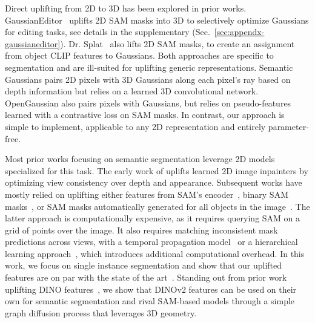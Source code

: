  Direct uplifting from 2D to 3D has been explored in prior works.
GaussianEditor~\citep{chen2024gaussianeditor} uplifts 2D SAM masks into 3D to selectively optimize Gaussians for editing tasks, see details in the supplementary (Sec.~\ref{sec:appendx-gaussianeditor}). Dr. Splat~\citep{jun2025drsplat} also lifts 2D SAM masks, to create an assignment from object CLIP features to Gaussians. Both approaches are specific to segmentation and are ill-suited for uplifting generic representations. Semantic Gaussians \citep{guo2024semantic} pairs 2D pixels with 3D Gaussians along each pixel’s ray based on depth information but relies on a learned 3D convolutional network. OpenGaussian \citep{wu2024opengaussian} also pairs pixels with  Gaussians, but relies on pseudo-features learned with a contrastive loss on SAM masks. In contrast, our approach is simple to implement, applicable to any 2D representation and entirely parameter-free.

Most prior works focusing on semantic segmentation leverage 2D models specialized for this task. The early work of \cite{yen2022nerfsupervision} uplifts learned 2D image inpainters by optimizing view consistency over depth and appearance. 
Subsequent works have mostly relied on uplifting either features from SAM's encoder~\citep{zhou2024feature3dgs}, binary SAM masks~\citep{cen2023segmentNeRF, cen2023segmentGS}, or SAM masks automatically generated for all objects in the image~\citep{ye2024gaussiangrouping, ying2023omniseg3d, kim2024garfield}.
The latter approach is computationally expensive, as it requires querying SAM on a grid of points over the image. It also requires matching inconsistent mask predictions across views, with \eg a temporal propagation model~\citep{ye2024gaussiangrouping} or a hierarchical learning approach~\citep{kim2024garfield}, which introduces additional computational overhead. In this work, we focus on single instance segmentation and show that our uplifted features are on par with the state of the art~\citep{cen2023segmentNeRF,cen2023segmentGS,ying2023omniseg3d}.
Standing out from prior work uplifting DINO features~\citep{tschernezki2022n3f,kobayashi2022decomposing,isrfgoel2023interactive,kerr2023lerf,liu2023weakly, ye2023featurenerf, zuo2024fmgs}, we show that DINOv2 features can be used on their own for semantic segmentation and rival SAM-based models through a simple graph diffusion process that leverages 3D geometry.

